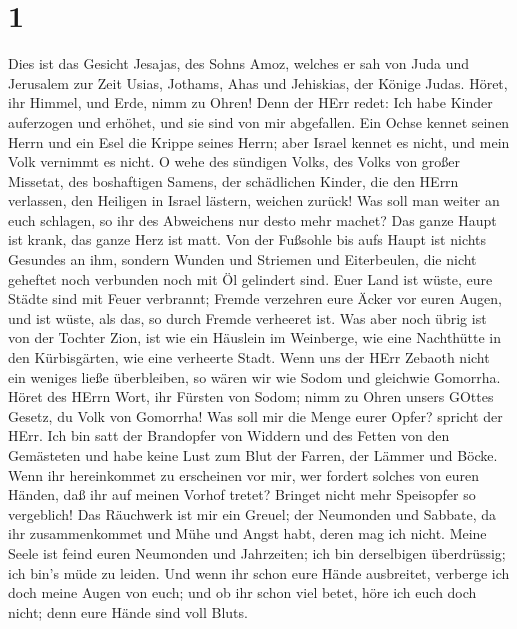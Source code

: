 \hypertarget{section}{%
\section{1}\label{section}}

 Dies ist das Gesicht Jesajas, des Sohns Amoz, welches er
sah von Juda und Jerusalem zur Zeit Usias, Jothams, Ahas und Jehiskias,
der Könige Judas.  Höret, ihr Himmel, und Erde, nimm zu
Ohren! Denn der HErr redet: Ich habe Kinder auferzogen und erhöhet, und
sie sind von mir abgefallen.  Ein Ochse kennet seinen Herrn
und ein Esel die Krippe seines Herrn; aber Israel kennet es nicht, und
mein Volk vernimmt es nicht.  O wehe des sündigen Volks, des
Volks von großer Missetat, des boshaftigen Samens, der schädlichen
Kinder, die den HErrn verlassen, den Heiligen in Israel lästern, weichen
zurück!  Was soll man weiter an euch schlagen, so ihr des
Abweichens nur desto mehr machet? Das ganze Haupt ist krank, das ganze
Herz ist matt.  Von der Fußsohle bis aufs Haupt ist nichts
Gesundes an ihm, sondern Wunden und Striemen und Eiterbeulen, die nicht
geheftet noch verbunden noch mit Öl gelindert sind.  Euer
Land ist wüste, eure Städte sind mit Feuer verbrannt; Fremde verzehren
eure Äcker vor euren Augen, und ist wüste, als das, so durch Fremde
verheeret ist.  Was aber noch übrig ist von der Tochter
Zion, ist wie ein Häuslein im Weinberge, wie eine Nachthütte in den
Kürbisgärten, wie eine verheerte Stadt.  Wenn uns der HErr
Zebaoth nicht ein weniges ließe überbleiben, so wären wir wie Sodom und
gleichwie Gomorrha.  Höret des HErrn Wort, ihr Fürsten von
Sodom; nimm zu Ohren unsers GOttes Gesetz, du Volk von Gomorrha!
 Was soll mir die Menge eurer Opfer? spricht der HErr. Ich
bin satt der Brandopfer von Widdern und des Fetten von den Gemästeten
und habe keine Lust zum Blut der Farren, der Lämmer und Böcke.
 Wenn ihr hereinkommet zu erscheinen vor mir, wer fordert
solches von euren Händen, daß ihr auf meinen Vorhof tretet?
 Bringet nicht mehr Speisopfer so vergeblich! Das Räuchwerk
ist mir ein Greuel; der Neumonden und Sabbate, da ihr zusammenkommet und
Mühe und Angst habt, deren mag ich nicht.  Meine Seele ist
feind euren Neumonden und Jahrzeiten; ich bin derselbigen überdrüssig;
ich bin's müde zu leiden.  Und wenn ihr schon eure Hände
ausbreitet, verberge ich doch meine Augen von euch; und ob ihr schon
viel betet, höre ich euch doch nicht; denn eure Hände sind voll Bluts.
